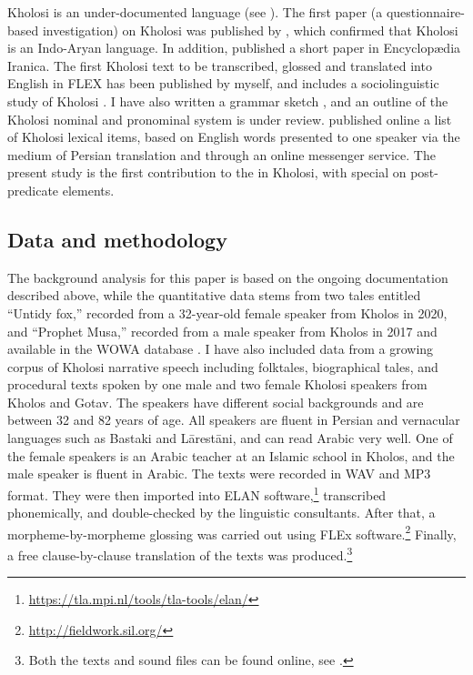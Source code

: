 \documentclass[output=paper,colorlinks,citecolor=brown]{langscibook}
\begin{document}
Kholosi is an under-documented language (see \citealt{nourzaei_documentation_2022}). The first paper (a questionnaire-based investigation) on Kholosi was published by \citet{anonby_shipwrecked_2016}, which confirmed that Kholosi is an Indo-Aryan language. In addition, \citet{Anonby2019Kholosi} published a short paper in Encyclopædia Iranica. The first Kholosi text to be transcribed, glossed and translated into English in FLEX has been published by myself, and includes a sociolinguistic study of Kholosi \citet{nourzaei_orality_2023}. I have also written a grammar sketch \citep{nourzaei_forthcoming_kholosi}, and an outline of the Kholosi nominal and pronominal system is under review. \citet{arora_kholosi_2021,nourzaei_forthcoming_morphosyntax} published online a list of Kholosi lexical items, based on English words presented to one speaker via the medium of Persian translation and through an online messenger service. The present study is the first contribution to the  in Kholosi, with special  on post-predicate elements. 

\subsection{Data and methodology}\label{Kholosi:ss:1.2}

The background analysis for this paper is based on the ongoing documentation described above, while the quantitative data stems from two tales entitled ``Untidy fox,'' recorded from a 32-year-old female speaker from Kholos in 2020, and ``Prophet Musa,'' recorded from a male speaker from Kholos in 2017 and available in the WOWA database \citep{nourzaei_kholosi_2022}. I have also included data from a growing corpus of Kholosi narrative speech including folktales, biographical tales, and procedural texts spoken by one male and two female Kholosi speakers from Kholos and Gotav. The speakers have different social backgrounds and are between 32 and 82 years of age. All speakers are fluent in Persian and vernacular languages such as Bastaki and Lārestāni, and can read Arabic very well. One of the female speakers is an Arabic teacher at an Islamic school in Kholos, and the male speaker is fluent in Arabic. The texts were recorded in WAV and MP3 format. They were then imported into ELAN software,\footnote{ \url{https://tla.mpi.nl/tools/tla-tools/elan/}} transcribed phonemically, and double-checked by the linguistic consultants. After that, a morpheme-by-morpheme glossing was carried out using {FLEx} software.\footnote{\url{http://fieldwork.sil.org/}} Finally, a free clause-by-clause translation of the texts was produced.\footnote{Both the texts and sound files can be found online, see \citet{nourzaei_kholosi_2022}.} 
\end{document}
